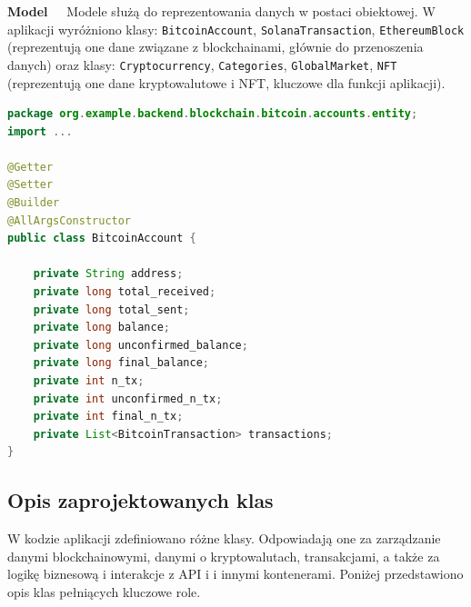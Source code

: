 \noindent \textbf{Model~~}
Modele służą do reprezentowania danych w postaci obiektowej. W aplikacji wyróżniono klasy: \texttt{BitcoinAccount}, \texttt{SolanaTransaction}, \texttt{EthereumBlock} (reprezentują one dane związane z blockchainami, głównie do przenoszenia danych) oraz klasy: \texttt{Cryptocurrency}, \texttt{Categories}, \texttt{GlobalMarket}, \texttt{NFT} (reprezentują one dane kryptowalutowe i NFT, kluczowe dla funkcji aplikacji).
\begin{lstlisting}[language=Java, style=JavaStyle]
package org.example.backend.blockchain.bitcoin.accounts.entity;
import ...

@Getter
@Setter
@Builder
@AllArgsConstructor
public class BitcoinAccount {

    private String address;
    private long total_received;
    private long total_sent;
    private long balance;
    private long unconfirmed_balance;
    private long final_balance;
    private int n_tx;
    private int unconfirmed_n_tx;
    private int final_n_tx;
    private List<BitcoinTransaction> transactions;
}
\end{lstlisting}

\subsection{Opis zaprojektowanych klas}
W kodzie aplikacji zdefiniowano różne klasy. Odpowiadają one za zarządzanie danymi blockchainowymi, danymi o kryptowalutach, transakcjami, a także za logikę biznesową i interakcje z API i i innymi kontenerami. Poniżej przedstawiono opis klas pełniących kluczowe role.\\[-10pt]

